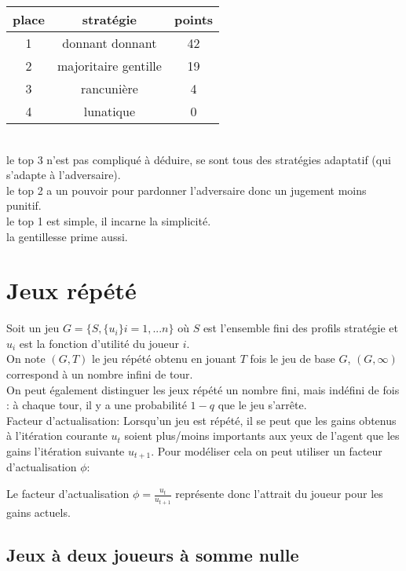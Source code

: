 \begin{center}
\begin{tabular}{c|cc}
place & stratégie & points \\
\hline
1 & donnant donnant & 42 \\
2 & majoritaire gentille & 19 \\
3 & rancunière & 4\\
4 & lunatique  & 0\\
\end{tabular}
\end{center}
\ \\
le top 3 n'est pas compliqué à déduire, se sont tous des stratégies adaptatif (qui s'adapte à l'adversaire).\\
le top 2 a un pouvoir pour pardonner l'adversaire donc un jugement moins punitif.\\
le top 1 est simple, il incarne la simplicité.\\
la gentillesse prime aussi.\\

\pagebreak
\section{Jeux répété}

Soit un jeu $G = \{S, \{u_i \} i=1,...n \}$ où $S$ est l'ensemble fini des profils stratégie et $u_i$ est la fonction d'utilité du joueur $i$.\\
On note $(G,T)$ le jeu répété obtenu en jouant $T$ fois le jeu de base $G$, $(G,\infty)$ correspond à un nombre infini de tour.\\

On peut également distinguer les jeux répété un nombre fini, mais indéfini de fois : à chaque tour, il y a une probabilité $1 - q$ 
que le jeu s'arrête.\\
Facteur d'actualisation: Lorsqu'un jeu est répété, il se peut que les gains obtenus à l'itération courante $u_t$ soient plus/moins importants aux yeux de l'agent que les gains  l'itération suivante $u_{t+1}$. Pour modéliser cela on peut utiliser un facteur d'actualisation $\phi$:

Le facteur d'actualisation $\phi = \frac{u_t}{u_{t+1}}$ représente donc l'attrait du joueur pour les gains actuels.

\subsection{Jeux à deux joueurs à somme nulle}

